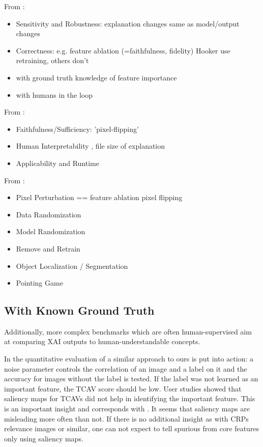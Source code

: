 From \cite{Yang2019}:
\begin{itemize}
    \item Sensitivity and Robustness: explanation changes same as model/output changes \cite{Adebayo2018,Ghorbani2019a}
    \item Correctness: e.g. feature ablation (=faithfulness, fidelity) \cite{Samek2017a,Fong2017,Hooker2019} Hooker use retraining, others don't
    \item with ground truth knowledge of feature importance \cite{Kim2018, Yang2019, Clark2023,Arras2022,Bau2017,Parafita2019,Singla2022}
    \item with humans in the loop \cite{Singla2022, Ribeiro2016, Rong2023,Kim2018}
\end{itemize}

From \cite{Samek2021}:
\begin{itemize}
    \item Faithfulness/Sufficiency: 'pixel-flipping' \cite{Samek2017}
    \item Human Interpretability \cite{Kim2018}, file size of explanation
    \item Applicability and Runtime
\end{itemize}

From \cite{Arras2022}:
\begin{itemize}
    \item Pixel Perturbation == feature ablation pixel flipping \cite{Samek2017a, Samek2021, Bach2015, Lundberg2017}
    \item Data Randomization \cite{Adebayo2018}
    \item Model Randomization \cite{Adebayo2018,Sixt2020}
    \item Remove and Retrain \cite{Hooker2019}
    \item Object Localization / Segmentation \cite{Simonyan2014}
    \item Pointing Game
\end{itemize}


\subsection{With Known Ground Truth}
Additionally, more complex benchmarks \cite{Kim2018, Arras2022, Bau2017, Singla2022} which are often human-supervised aim at comparing XAI outputs to human-understandable concepts.

In the quantitative evaluation of \cite{Kim2018} a similar approach to ours is put into action:
a noise parameter controls the correlation of an image and a label on it and the accuracy for images without the label is tested. If the label was not learned as an important feature, the TCAV score should be low. User studies showed that saliency maps for TCAVs did not help in identifying the important feature. This is an important insight and corresponds with \cite{Sixt2022a}. It seems that saliency maps are misleading more often than not. If there is no additional insight as with CRPs relevance images or similar, one can not expect to tell spurious from core features only using saliency maps.

